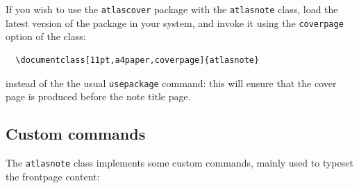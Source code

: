 \documentclass[11pt,a4paper]{../atlasnote}
\begin{document}
If you wish to use the \texttt{atlascover} package with the 
\texttt{atlasnote} class, load the latest version of the package in your
system, and invoke it using the \texttt{coverpage} option of the class:
\begin{verbatim}
  \documentclass[11pt,a4paper,coverpage]{atlasnote}
\end{verbatim}
instead of the the usual \texttt{usepackage} command: this will ensure
that the cover page is produced before the note title page.

\subsection{Custom commands}

The \texttt{atlasnote} class implements some custom commands, mainly
used to typeset the frontpage content:
\end{document}
